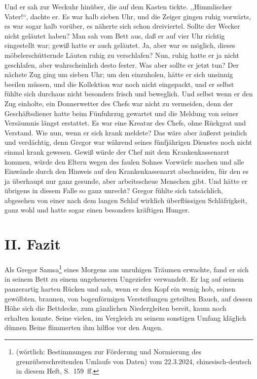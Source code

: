 \documentclass[]{zchinr}
\begin{document}
Und er sah zur Weckuhr hinüber, die auf dem Kasten tickte. ,,Himmlischer Vater!``, dachte er. Es war halb sieben Uhr, und die Zeiger gingen ruhig vorwärts, es war sogar halb vorüber, es näherte sich schon dreiviertel. Sollte der Wecker nicht geläutet haben? Man sah vom Bett aus, daß er auf vier Uhr richtig eingestellt war; gewiß hatte er auch geläutet. Ja, aber war es möglich, dieses möbelerschütternde Läuten ruhig zu verschlafen? Nun, ruhig hatte er ja nicht geschlafen, aber wahrscheinlich desto fester. Was aber sollte er jetzt tun? Der nächste Zug ging um sieben Uhr; um den einzuholen, hätte er sich unsinnig beeilen müssen, und die Kollektion war noch nicht eingepackt, und er selbst fühlte sich durchaus nicht besonders frisch und beweglich. Und selbst wenn er den Zug einholte, ein Donnerwetter des Chefs war nicht zu vermeiden, denn der Geschäftsdiener hatte beim Fünfuhrzug gewartet und die Meldung von seiner Versäumnis längst erstattet. Es war eine Kreatur des Chefs, ohne Rückgrat und Verstand. Wie nun, wenn er sich krank meldete? Das wäre aber äußerst peinlich und verdächtig, denn Gregor war während seines fünfjährigen Dienstes noch nicht einmal krank gewesen. Gewiß würde der Chef mit dem Krankenkassenarzt kommen, würde den Eltern wegen des faulen Sohnes Vorwürfe machen und alle Einwände durch den Hinweis auf den Krankenkassenarzt abschneiden, für den es ja überhaupt nur ganz gesunde, aber arbeitsscheue Menschen gibt. Und hätte er übrigens in diesem Falle so ganz unrecht? Gregor fühlte sich tatsächlich, abgesehen von einer nach dem langen Schlaf wirklich überflüssigen Schläfrigkeit, ganz wohl und hatte sogar einen besonders kräftigen Hunger.

\section{II. Fazit}

Als Gregor Samsa\footnote{ (wörtlich: Bestimmungen zur Förderung und Normierung des grenzüberschreitenden Umlaufs von Daten) vom 22.3.2024, chinesisch-deutsch in diesem Heft, S.~159~ff.} eines Morgens aus unruhigen Träumen erwachte, fand er sich in seinem Bett zu einem ungeheueren Ungeziefer verwandelt. Er lag auf seinem panzerartig harten Rücken und sah, wenn er den Kopf ein wenig hob, seinen gewölbten, braunen, von bogenförmigen Versteifungen geteilten Bauch, auf dessen Höhe sich die Bettdecke, zum gänzlichen Niedergleiten bereit, kaum noch erhalten konnte. Seine vielen, im Vergleich zu seinem sonstigen Umfang kläglich dünnen Beine flimmerten ihm hilflos vor den Augen.
\end{document}
